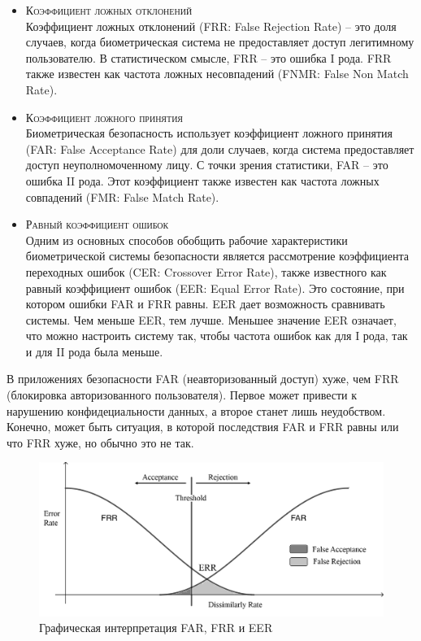 \documentclass[12pt]{article}
\begin{document}
    \begin{itemize}
        \item \textsc{Коэффициент ложных отклонений} \\
        Коэффициент ложных отклонений (FRR: False Rejection Rate) -- это доля случаев, когда биометрическая система не предоставляет доступ легитимному пользователю. В статистическом смысле, FRR -- это ошибка I рода. FRR также известен как частота ложных несовпадений (FNMR: False Non Match Rate).

        \item \textsc{Коэффициент ложного принятия} \\
        Биометрическая безопасность использует коэффициент ложного принятия (FAR: False Acceptance Rate) для доли случаев, когда система предоставляет доступ неуполномоченному лицу. С точки зрения статистики, FAR -- это ошибка II рода. Этот коэффициент также известен как частота ложных совпадений (FMR: False Match Rate).

        \item \textsc{Равный коэффициент ошибок} \\
        Одним из основных способов обобщить рабочие характеристики биометрической системы безопасности является рассмотрение коэффициента переходных ошибок (CER: Crossover Error Rate), также известного как равный коэффициент ошибок (EER: Equal Error Rate). Это состояние, при котором ошибки FAR и FRR равны. EER дает возможность сравнивать системы. Чем меньше EER, тем лучше. Меньшее значение EER означает, что можно настроить систему так, чтобы частота ошибок как для I рода, так и для II рода была меньше.
    \end{itemize}

    \par В приложениях безопасности FAR (неавторизованный доступ) хуже, чем FRR (блокировка авторизованного пользователя). Первое может привести к нарушению конфидециальности данных, а второе станет лишь неудобством. Конечно, может быть ситуация, в которой последствия FAR и FRR равны или что FRR хуже, но обычно это не так.
    \vspace{5mm}
    \begin{figure}[h!]
        \centering
        \includegraphics[width=\linewidth]{FAR_FRR_ERR.png}
        \caption{Графическая интерпретация FAR, FRR и EER}
        \label{sec:Overview:Metrics:fig:FAR_FRR_EER}
    \end{figure}
\end{document}
